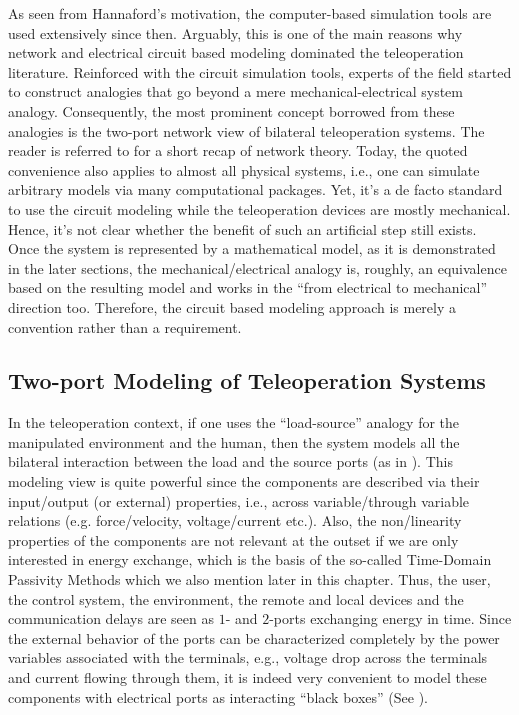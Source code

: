 As seen from Hannaford's motivation, the computer-based simulation tools are used extensively since then. Arguably,
this is one of the main reasons why network and electrical circuit based modeling dominated the teleoperation literature. 
Reinforced with the circuit simulation tools, experts of the field started to construct analogies that go beyond
a mere mechanical-electrical system analogy. Consequently, the most prominent concept borrowed from these analogies is the two-port 
network view of bilateral teleoperation systems. The reader is referred to  for a short recap of network theory.
Today, the quoted convenience also applies to almost all physical systems, i.e., one can simulate arbitrary models via many 
computational packages. Yet, it's a de facto standard to use the circuit modeling while the teleoperation devices are mostly 
mechanical. Hence, it's not clear whether the benefit of such an artificial step still exists. Once the system is represented 
by a mathematical model, as it is demonstrated in the later sections, the mechanical/electrical analogy is, roughly, an equivalence
based on the resulting model and works in the \enquote{from electrical to mechanical} direction too. Therefore, the 
circuit based modeling approach is merely a convention rather than a requirement.

\subsection{Two-port Modeling of Teleoperation Systems}

In the teleoperation context, if one uses the \enquote{load-source} analogy for the manipulated environment 
and the human, then the system models all the bilateral interaction between the load and the source 
ports (as in ). This modeling view is quite powerful since the components are described via 
their input/output (or external) properties, i.e., across variable/through variable relations (e.g. force/velocity, 
voltage/current etc.). Also, the non/linearity properties of the components are not relevant at the outset if we 
are only interested in energy exchange, which is the basis of the so-called Time-Domain Passivity Methods 
\cite{hannafordryu} which we also mention later in this chapter. Thus, the user, the control system, the 
environment, the remote and local devices and the communication delays are seen as $1$- and $2$-ports exchanging 
energy in time. Since the external behavior of the ports can be characterized completely by the power variables 
associated with the terminals, e.g., voltage drop across the terminals and current flowing through them, it is 
indeed very convenient to model these components with electrical ports as interacting \enquote{black boxes} 
(See ).

